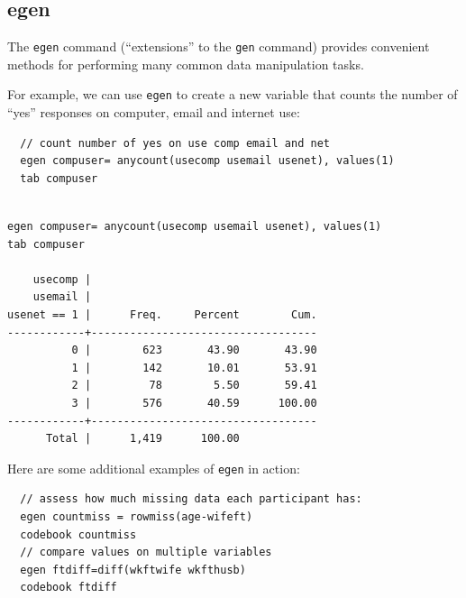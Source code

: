 \documentclass[]{book}
\begin{document}
\subsection{egen}\label{egen}

The \texttt{egen} command (``extensions'' to the \texttt{gen} command)
provides convenient methods for performing many common data manipulation
tasks.

For example, we can use \texttt{egen} to create a new variable that
counts the number of ``yes'' responses on computer, email and internet
use:

\begin{verbatim}
  // count number of yes on use comp email and net 
  egen compuser= anycount(usecomp usemail usenet), values(1)
  tab compuser
\end{verbatim}

\begin{verbatim}

egen compuser= anycount(usecomp usemail usenet), values(1)
tab compuser

    usecomp |
    usemail |
usenet == 1 |      Freq.     Percent        Cum.
------------+-----------------------------------
          0 |        623       43.90       43.90
          1 |        142       10.01       53.91
          2 |         78        5.50       59.41
          3 |        576       40.59      100.00
------------+-----------------------------------
      Total |      1,419      100.00
\end{verbatim}

Here are some additional examples of \texttt{egen} in action:

\begin{verbatim}
  // assess how much missing data each participant has:
  egen countmiss = rowmiss(age-wifeft)
  codebook countmiss
  // compare values on multiple variables
  egen ftdiff=diff(wkftwife wkfthusb)
  codebook ftdiff
\end{verbatim}
\end{document}
